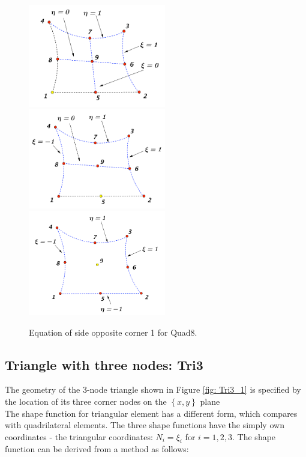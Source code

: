 \begin{figure}[h]
	\begin{center}
		\includegraphics[width=6cm,clip]{Quad8_2.pdf} 
		\includegraphics[width=6cm,clip]{Quad8_3.pdf}	
		\includegraphics[width=6cm,clip]{Quad8_4.pdf}
		\caption{Equation of side opposite corner 1 for Quad8.} \label{fig: Quad8_2}	
	\end{center} 
\end{figure}

\subsection{Triangle with three nodes: Tri3}
The geometry of the 3-node triangle shown in Figure \ref{fig: Tri3_1} is specified by the location of its three corner nodes on the $\left\{x, y\right\}$ plane \\

The shape function for triangular element has a different form, which compares with quadrilateral elements. The three shape functions have the simply own coordinates - the triangular coordinates: $N_i = \xi_i$ for $i = 1, 2, 3.$ The shape function can be derived from a method as follows: \\

